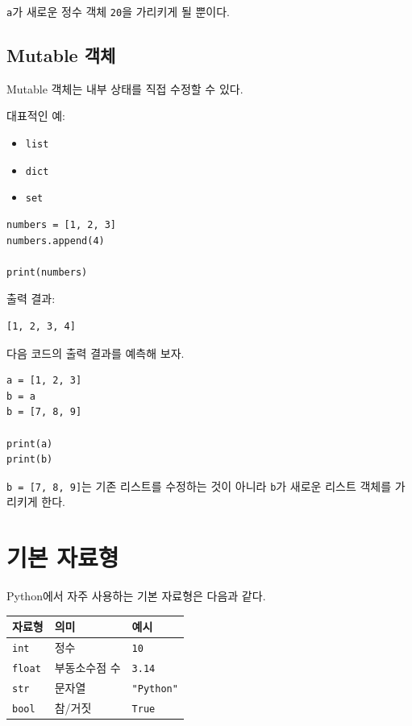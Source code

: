 \documentclass[11pt,a4paper]{article}
\begin{document}
\texttt{a}가 새로운 정수 객체 \texttt{20}을 가리키게 될 뿐이다.

\subsection{Mutable 객체}

Mutable 객체는 내부 상태를 직접 수정할 수 있다.

대표적인 예:

\begin{itemize}
    \item \texttt{list}
    \item \texttt{dict}
    \item \texttt{set}
\end{itemize}

\begin{lstlisting}
numbers = [1, 2, 3]
numbers.append(4)

print(numbers)
\end{lstlisting}

출력 결과:

\begin{verbatim}
[1, 2, 3, 4]
\end{verbatim}

\begin{checkpointbox}
다음 코드의 출력 결과를 예측해 보자.

\begin{lstlisting}
a = [1, 2, 3]
b = a
b = [7, 8, 9]

print(a)
print(b)
\end{lstlisting}

\texttt{b = [7, 8, 9]}는 기존 리스트를 수정하는 것이 아니라
\texttt{b}가 새로운 리스트 객체를 가리키게 한다.
\end{checkpointbox}

\section{기본 자료형}

Python에서 자주 사용하는 기본 자료형은 다음과 같다.

\begin{center}
\begin{tabular}{lll}
\toprule
자료형 & 의미 & 예시 \\
\midrule
\texttt{int} & 정수 & \texttt{10} \\
\texttt{float} & 부동소수점 수 & \texttt{3.14} \\
\texttt{str} & 문자열 & \texttt{"Python"} \\
\texttt{bool} & 참/거짓 & \texttt{True} \\
\bottomrule
\end{tabular}
\end{center}
\end{document}
